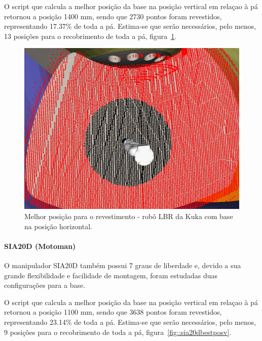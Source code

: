 O script que calcula a melhor posição da base na posição vertical em relaçao à
pá retornou a posição 1400 mm, sendo que 2730 pontos foram revestidos,
representando 17.37\% de toda a pá. Estima-se que serão necessários, pelo menos,
13 posições para o recobrimento de toda a pá, figura~\ref{fig::lbrbestposh}.

\begin{figure}[h!]	
	\includegraphics[width=\columnwidth]{figs/bighatch/lbr_bestposh.png}
	\caption{Melhor posição para o revestimento - robô LBR da Kuka com base na
	posição horizontal.}
	\label{fig::lbrbestposh}
\end{figure}

\paragraph{SIA20D (Motoman)}
O manipulador SIA20D também possui 7 graus de liberdade e, devido a sua
grande flexibilidade e facilidade de montagem, foram estudadas duas
configurações para a base.

O script que calcula a melhor posição da base na posição vertical em relaçao à
pá retornou a posição 1100 mm, sendo que 3638 pontos foram revestidos,
representando 23.14\% de toda a pá. Estima-se que serão necessários, pelo menos,
9 posições para o recobrimento de toda a pá, figura~\ref{fig::sia20dbestposv}.

